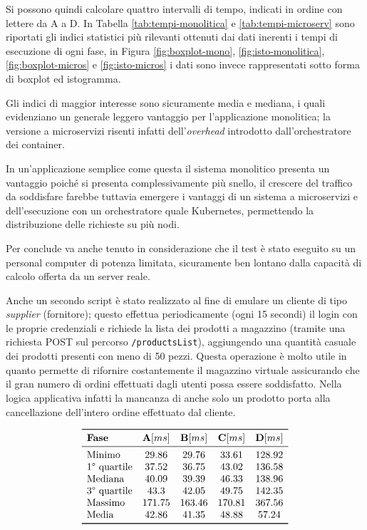 	Si possono quindi calcolare quattro intervalli di tempo, indicati in ordine con lettere da A a D.
	In Tabella \ref{tab:tempi-monolitica} e \ref{tab:tempi-microserv} sono riportati gli indici statistici più rilevanti ottenuti dai dati inerenti i tempi di esecuzione di ogni fase, in Figura \ref{fig:boxplot-mono}, \ref{fig:isto-monolitica}, \ref{fig:boxplot-micros} e \ref{fig:isto-micros} i dati sono invece rappresentati sotto forma di boxplot ed istogramma.

	Gli indici di maggior interesse sono sicuramente media e mediana, i quali evidenziano un generale leggero vantaggio per l'applicazione monolitica;
	la versione a microservizi risenti infatti dell'\emph{overhead} introdotto dall'orchestratore dei container.
	
	In un'applicazione semplice come questa il sistema monolitico presenta un vantaggio poiché si presenta complessivamente più snello,
	il crescere del traffico da soddisfare farebbe tuttavia emergere i vantaggi di un sistema a microservizi e dell'esecuzione con un orchestratore quale Kubernetes, permettendo la distribuzione delle richieste su più nodi.
	
	Per conclude va anche tenuto in considerazione che il test è stato eseguito su un personal computer di potenza limitata, sicuramente ben lontano dalla capacità di calcolo offerta da un server reale.
	
	\medskip
	Anche un secondo script è stato realizzato al fine di emulare un cliente di tipo \emph{supplier} (fornitore);
	questo effettua periodicamente (ogni 15 secondi) il login con le proprie credenziali e richiede la lista dei prodotti a magazzino (tramite una richiesta POST sul percorso \texttt{/productsList}), aggiungendo una quantità casuale dei prodotti presenti con meno di 50 pezzi.
	Questa operazione è molto utile in quanto permette di rifornire costantemente il magazzino virtuale assicurando che il gran numero di ordini effettuati dagli utenti possa essere soddisfatto.
	Nella logica applicativa infatti la mancanza di anche solo un prodotto porta alla cancellazione dell'intero ordine effettuato dal cliente.


	\begin{table}[tbp]
		\[
		\begin{array}{lccccc}
			\toprule
			\mbox{\textbf{Fase}} & \textbf{A}[ms] & \textbf{B}[ms] & \textbf{C}[ms] & \textbf{D}[ms]\\
			\midrule
			\mbox{Minimo} & 29.86 & 29.76 & 33.61 & 128.92\\
			\mbox{1° quartile} & 37.52 & 36.75 & 43.02 & 136.58\\
			\mbox{Mediana} & 40.09 & 39.39 & 46.33 & 138.96\\
			\mbox{3° quartile} & 43.3 & 42.05 & 49.75 & 142.35\\
			\mbox{Massimo} & 171.75 & 163.46 & 170.81 & 367.56\\
			\mbox{Media} & 42.86 & 41.35 & 48.88 & 57.24\\
			\bottomrule
		\end{array}
		\]
		\caption{Valori statistici ottenuti dall'esecuzione dell'applicazione monolitica}
		\label{tab:tempi-monolitica}
	\end{table}
	
